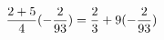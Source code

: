 \documentclass[preview]{standalone}
\begin{document}
\begin{align*}
\special{dvisvgm:raw <g id='unique000'>}\frac{2 + 5}{4} (- \frac{2}{93}) = \frac{2}{3} + 9(- \frac{2}{93})\special{dvisvgm:raw </g>}
\end{align*}
\end{document}
